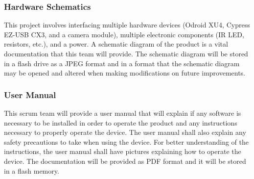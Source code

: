 \subsubsection{Hardware Schematics}
This project involves interfacing multiple hardware devices (Odroid XU4, Cypress EZ-USB CX3, and a camera module), multiple electronic components (IR LED, resistors, etc.), and a power. A schematic diagram of the product is a vital documentation that this team will provide. The schematic diagram will be stored in a flash drive as a JPEG format and in a format that the schematic diagram may be opened and altered when making modifications on future improvements.

\subsubsection{User Manual}
This scrum team will provide a user manual that will explain if any software is necessary to be installed in order to operate the product and any instructions necessary to properly operate the device. The user manual shall also explain any safety precautions to take when using the device. For better understanding of the instructions, the user manual shall have pictures explaining how to operate the device. The documentation will be provided as PDF format and it will be stored in a flash memory.